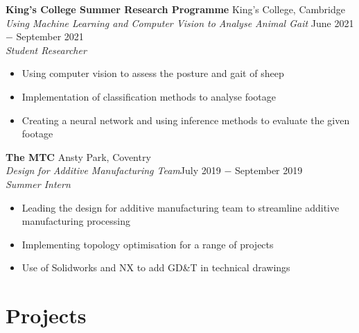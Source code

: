 \documentclass{article}
\begin{document}
\textbf{King's College Summer Research Programme} \hfill King's College, Cambridge \\
\textit{Using Machine Learning and Computer Vision to Analyse Animal Gait} \hfill June 2021 $-$ September 2021\\
\textit{Student Researcher}
\begin{itemize}
    \item Using computer vision to assess the posture and gait of sheep
    \item Implementation of classification methods to analyse footage
    \item Creating a neural network and using inference methods to evaluate the given footage
\end{itemize} \medskip

\textbf{The MTC} \hfill Ansty Park, Coventry \\
\textit{Design for Additive Manufacturing Team}\hfill July 2019 $-$ September 2019\\
\textit{Summer Intern}
\begin{itemize}
    \item Leading the design for additive manufacturing team to streamline additive manufacturing processing
    \item Implementing topology optimisation for a range of projects
    \item Use of Solidworks and NX to add GD\&T in technical drawings
\end{itemize} \medskip


\vspace{-.5\baselineskip}
\hrulefill
\vspace{-.5\baselineskip}

\section*{Projects}
\end{document}
